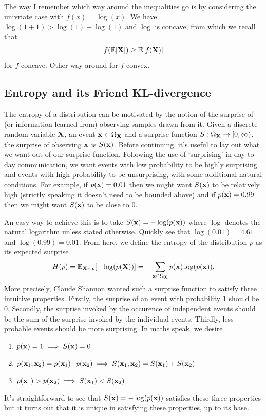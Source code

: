 \documentclass[11pt]{article}
\begin{document}
\begin{appendices}
The way I remember which way around the inequalities go is by considering the univriate case with $f(x)=\log(x)$. We have $\log(1+1)>\log(1)+\log(1)$ and $\log$ is concave, from which we recall that
$$
f(\mathbb{E}[\mathbf{X}])
\geq
\mathbb{E}[f(\mathbf{X})]
$$
for $f$ concave. Other way around for $f$ convex.

\subsection{Entropy and its Friend KL-divergence}
\label{app:entropy}

The entropy of a distribution can be motivated by the notion of the surprise of (or information learned from) observing samples drawn from it. Given a discrete random variable $\mathbf{X}$, an event $\mathbf{x}\in\Omega_{\mathbf{X}}$ and a surprise function $S:\Omega_{\mathbf{X}}\rightarrow[0,\infty)$, the surprise of observing $\mathbf{x}$ is $S(\mathbf{x})$. Before continuing, it's useful to lay out what we want out of our surprise function. Following the use of `surprising' in day-to-day communication, we want events with low probability to be highly surprising and events with high probability to be unsurprising, with some additional natural conditions. For example, if $p(\mathbf{x})=0.01$ then we might want $S(\mathbf{x})$ to be relatively high (strictly speaking it doesn't need to be bounded above) and if $p(\mathbf{x})=0.99$ then we might want $S(\mathbf{x})$ to be close to 0.

An easy way to achieve this is to take $S(\mathbf{x})=-\log(p(\mathbf{x}))$ where $\log$ denotes the natural logarithm unless stated otherwise. Quickly see that $\log(0.01)=4.61$ and $\log(0.99)=0.01$. From here, we define the entropy of the distribution $p$ as its expected surprise
$$
H(p)
=
\mathbb{E}_{\mathbf{X}\sim p}[-\log(p(\mathbf{X}))]
=
-\sum_{\mathbf{x}\in \Omega_{\mathbf{X}}}p(\mathbf{x})\log(p(\mathbf{x})).
$$
More precisely, Claude Shannon wanted such a surprise function to satisfy three intuitive properties. Firstly, the surprise of an event with probability $1$ should be $0$. Secondly, the surprise invoked by the occurence of independent events should be the sum of the surprise invoked by the individual events. Thirdly, less probable events should be more surprising. In maths speak, we desire
\begin{enumerate}
    \item $p(\mathbf{x})=1\implies S(\mathbf{x})=0$
    \item $p(\mathbf{x}_1,\mathbf{x}_2)=p(\mathbf{x}_1)\cdot p(\mathbf{x}_2)\implies S(\mathbf{x}_1,\mathbf{x}_2)=S(\mathbf{x}_1)+S(\mathbf{x}_2)$
    \item $p(\mathbf{x}_1)>p(\mathbf{x}_2)\implies S(\mathbf{x}_1)<S(\mathbf{x}_2)$
\end{enumerate}
It's straightforward to see that $S(\mathbf{x})=-\log(p(\mathbf{x}))$ satisfies these three properties but it turns out that it is unique in satisfying these properties, up to its base.


\end{appendices}
\end{document}
